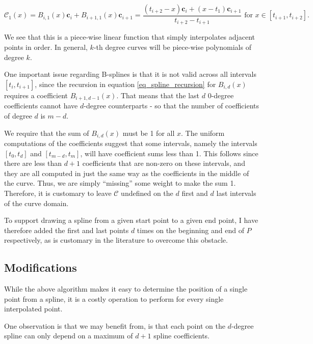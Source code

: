 \documentclass[english]{article}
\begin{document}
\[
\mathcal{C}_1(x) = B_{i,1}(x)\mathbf{c}_i + B_{i+1,1}(x)\mathbf{c}_{i + 1} = \dfrac{(t_{i + 2} - x)\mathbf{c}_i + (x - t_1)\mathbf{c}_{i + 1}}{t_{i + 2} - t_{i + 1}} \text{ for } x \in [t_{i + 1}, t_{i + 2}].
\]

We see that this is a piece-wise linear function that simply interpolates adjacent points in order. In general, $k$-th degree curves will be piece-wise polynomials of degree $k$.

One important issue regarding B-splines is that it is not valid across all intervals $[t_i, t_{i + 1}]$, since the recursion in equation \ref{eq_spline_recursion} for $B_{i,d}(x)$ requires a coefficient $B_{i + 1, d - 1}(x)$. That means that the last $d$ 0-degree coefficients cannot have $d$-degree counterparts - so that the number of coefficients of degree $d$ is $m - d$.

We require that the sum of $B_{i,d}(x)$ must be 1 for all $x$. The uniform computations of the coefficients suggest that some intervals, namely the intervals $[t_0, t_d]$ and $[t_{m-d},t_{m}]$, will have coefficient sums less than 1. This follows since there are less than $d + 1$ coefficients that are non-zero on these intervals, and they are all computed in just the same way as the coefficients in the middle of the curve. Thus, we are simply ``missing'' some weight to make the sum 1. Therefore, it is customary to leave $\mathcal{C}$ undefined on the $d$ first and $d$ last intervals of the curve domain.

To support drawing a spline from a given start point to a given end point, I have therefore added the first and last points $d$ times on the beginning and end of $P$ respectively, as is customary in the literature to overcome this obstacle.

\subsection{Modifications}

While the above algorithm makes it easy to determine the position of a single point from a spline, it is a costly operation to perform for every single interpolated point.

One observation is that we may benefit from, is that each point on the $d$-degree spline can only depend on a maximum of $d + 1$ spline coefficients. 

\end{document}
